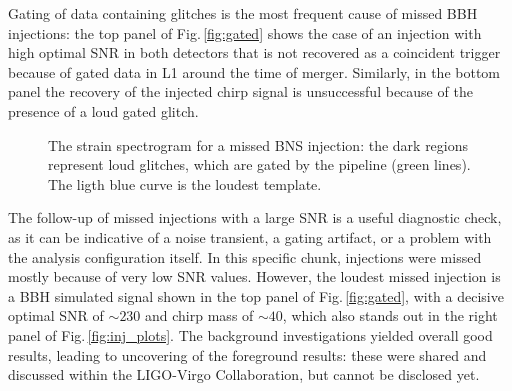 \documentclass[binding=0.6cm, LaM]{sapthesis}
\begin{document}
\begin{itemize}
            Gating of data containing glitches is the most frequent cause of missed BBH injections:
            the top panel of Fig.\,\ref{fig:gated} shows the case of an injection with high optimal SNR in both detectors that is not recovered as a coincident trigger because of gated data in L1 around the time of merger.
            Similarly, in the bottom panel the recovery of the injected chirp signal is unsuccessful because of the presence of a loud gated glitch.
        \end{itemize}
    	
        \begin{figure}[t]
          \noindent
          \label{gated_glitch}
          \centering
          \caption{The strain spectrogram for a missed BNS injection: the dark regions represent loud glitches, which are gated by the pipeline (green lines). The ligth blue curve is the loudest template.}
          \label{fig:gated_glitch}
        \end{figure}

	The follow-up of missed injections with a large SNR is a useful diagnostic check, 
	as it can be indicative of a noise transient, a gating artifact, or a problem with the analysis configuration itself.
	In this specific chunk, injections were missed mostly because of very low SNR values.
	However, the loudest missed injection is a BBH simulated signal shown in the top panel of Fig.\,\ref{fig:gated},
	with a decisive optimal SNR of $\sim 230$ and chirp mass of $\sim 40$,
	which also stands out in the right panel of Fig.\,\ref{fig:inj_plots}.
	The background investigations yielded overall good results,
	leading to uncovering of the foreground results:
	these were shared and discussed within the LIGO-Virgo Collaboration, but cannot be disclosed yet.
\end{document}
